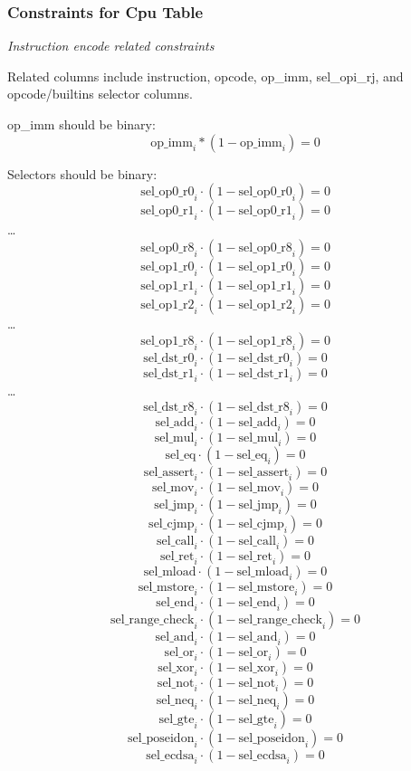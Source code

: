 \subsubsection{Constraints for Cpu Table} \label{sec:cpu-constraints}

\emph{Instruction encode related constraints}

Related columns include instruction, opcode, op\_imm, sel\_opi\_rj, and opcode/builtins selector columns.

op\_imm should be binary:
\[ \mathrm{op\_imm}_i * (1 - \mathrm{op\_imm}_i) = 0 \]

Selectors should be binary:
\[ \mathrm{sel\_op0\_r0}_i \cdot (1-\mathrm{sel\_op0\_r0}_i) = 0 \]
\[ \mathrm{sel\_op0\_r1}_i \cdot (1-\mathrm{sel\_op0\_r1}_i) = 0 \]
\dots
\[ \mathrm{sel\_op0\_r8}_i \cdot (1-\mathrm{sel\_op0\_r8}_i) = 0 \]
\[ \mathrm{sel\_op1\_r0}_i \cdot (1-\mathrm{sel\_op1\_r0}_i) = 0 \]
\[ \mathrm{sel\_op1\_r1}_i \cdot (1-\mathrm{sel\_op1\_r1}_i) = 0 \]
\[ \mathrm{sel\_op1\_r2}_i \cdot (1-\mathrm{sel\_op1\_r2}_i) = 0 \]
\dots
\[ \mathrm{sel\_op1\_r8}_i \cdot (1-\mathrm{sel\_op1\_r8}_i) = 0 \]
\[ \mathrm{sel\_dst\_r0}_i \cdot (1-\mathrm{sel\_dst\_r0}_i) = 0 \]
\[ \mathrm{sel\_dst\_r1}_i \cdot (1-\mathrm{sel\_dst\_r1}_i) = 0 \]
\dots
\[ \mathrm{sel\_dst\_r8}_i \cdot (1-\mathrm{sel\_dst\_r8}_i) = 0 \]
\[ \mathrm{sel\_add}_i \cdot (1-\mathrm{sel\_add}_i) = 0 \]
\[ \mathrm{sel\_mul}_i \cdot (1-\mathrm{sel\_mul}_i) = 0 \]
\[ \mathrm{sel\_eq} \cdot (1-\mathrm{sel\_eq}_i) = 0 \]
\[ \mathrm{sel\_assert}_i \cdot (1-\mathrm{sel\_assert}_i) = 0 \]
\[ \mathrm{sel\_mov}_i \cdot (1 - \mathrm{sel\_mov}_i) = 0 \]
\[ \mathrm{sel\_jmp}_i \cdot (1 - \mathrm{sel\_jmp}_i) = 0 \]
\[ \mathrm{sel\_cjmp}_i \cdot (1 - \mathrm{sel\_cjmp}_i) = 0 \]
\[ \mathrm{sel\_call}_i \cdot (1 - \mathrm{sel\_call}_i) = 0 \]
\[ \mathrm{sel\_ret}_i \cdot (1 - \mathrm{sel\_ret}_i) = 0 \]
\[ \mathrm{sel\_mload} \cdot (1 - \mathrm{sel\_mload}_i) = 0 \]
\[ \mathrm{sel\_mstore}_i \cdot (1 - \mathrm{sel\_mstore}_i) = 0 \]
\[ \mathrm{sel\_end}_i  \cdot (1 - \mathrm{sel\_end}_i) = 0 \]
\[ \mathrm{sel\_range\_check}_i \cdot (1 - \mathrm{sel\_range\_check}_i) = 0 \]
\[ \mathrm{sel\_and}_i \cdot (1 - \mathrm{sel\_and}_i) = 0 \]
\[ \mathrm{sel\_or}_i \cdot (1 - \mathrm{sel\_or}_i) = 0 \]
\[ \mathrm{sel\_xor}_i \cdot (1 - \mathrm{sel\_xor}_i) = 0 \]
\[ \mathrm{sel\_not}_i \cdot (1 - \mathrm{sel\_not}_i) = 0 \]
\[ \mathrm{sel\_neq}_i \cdot (1 - \mathrm{sel\_neq}_i) = 0 \]
\[ \mathrm{sel\_gte}_i \cdot (1 - \mathrm{sel\_gte}_i) = 0 \]
\[ \mathrm{sel\_poseidon}_i \cdot (1 - \mathrm{sel\_poseidon}_i) = 0 \]
\[ \mathrm{sel\_ecdsa}_i \cdot (1 - \mathrm{sel\_ecdsa}_i) = 0 \]

